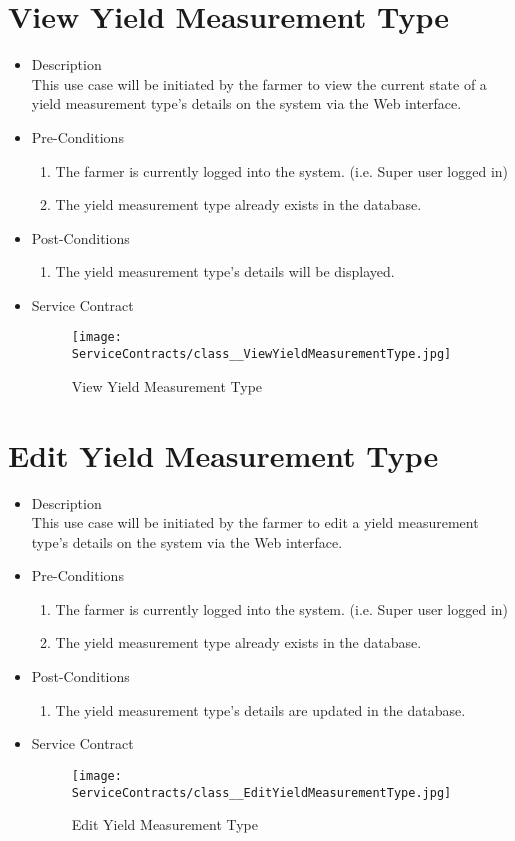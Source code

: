 \documentclass[11pt,fleqn]{book} %
\begin{document}
\section{View Yield Measurement Type}
\begin{itemize}
	\item Description\\
	This use case will be initiated by the farmer to view the current state of a yield measurement type’s details on the system via the Web interface.
	\item Pre-Conditions
	\begin{enumerate}
		\item The farmer is currently logged into the system. (i.e. Super user logged in)
		\item The yield measurement type already exists in the database.		
	\end{enumerate}
	\item Post-Conditions
	\begin{enumerate}
		\item The yield measurement type’s details will be displayed.
	\end{enumerate}
	\item Service Contract
	\begin{figure}
		\texttt{[image: ServiceContracts/class\_\_ViewYieldMeasurementType.jpg]}
		\caption{View Yield Measurement Type}
	\end{figure}
\end{itemize}

\section{Edit Yield Measurement Type}
\begin{itemize}
	\item Description\\
	This use case will be initiated by the farmer to edit a yield measurement type’s details on the system via the Web interface.
	\item Pre-Conditions
	\begin{enumerate}
		\item The farmer is currently logged into the system. (i.e. Super user logged in)
		\item The yield measurement type already exists in the database.					
	\end{enumerate}
	\item Post-Conditions
	\begin{enumerate}
		\item The yield measurement type’s details are updated in the database.
	\end{enumerate}
	\item Service Contract
	\begin{figure}
		\texttt{[image: ServiceContracts/class\_\_EditYieldMeasurementType.jpg]}
		\caption{Edit Yield Measurement Type}
	\end{figure}
\end{itemize}
\end{document}
